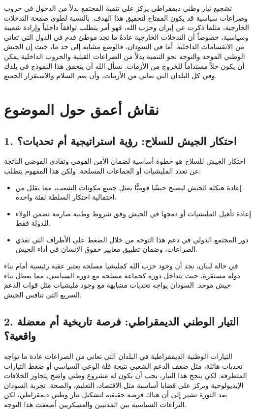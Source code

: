 \documentclass[12pt]{article}
\begin{document}
تشجيع تيار وطني ديمقراطي يركز على تنمية المجتمع بدلاً من الدخول في حروب وصراعات سياسية قد يكون المفتاح لتحقيق هذا الهدف. بالنسبة لطوي صفحة التدخلات الخارجية، مثلما ذكرت عن إيران وحزب الله، فهو أمر يتطلب توافقاً داخلياً وإرادة شعبية وسياسية، خصوصاً أن التدخلات الخارجية عادةً ما تجد موطئ قدم في الدول التي تعاني من الانقسامات الداخلية. أما في السودان، فالوضع مشابه إلى حد ما، حيث إن الجيش الوطني الموحد والتوجه نحو التنمية بدلاً من الصراعات القبلية والحروب الداخلية يمكن أن يكون حلاً مستداماً للخروج من الأزمات. نسأل الله أن يتحقق هذا النموذج في بلدك وفي كل البلدان التي تعاني من الأزمات، وأن يعم السلام والاستقرار الجميع.

\section*{نقاش أعمق حول الموضوع}

\subsection*{1. احتكار الجيش للسلاح: رؤية استراتيجية أم تحديات؟}
احتكار الجيش للسلاح هو خطوة أساسية لضمان الأمن القومي وتفادي الفوضى الناتجة عن تعدد المليشيات أو الجماعات المسلحة. ولكن هذا المفهوم يتطلب:
\begin{itemize}
    \item إعادة هيكلة الجيش ليصبح جيشًا قوميًّا يمثل جميع مكونات الشعب، مما يقلل من احتمالية احتكار السلطة لفئة واحدة.
    \item إعادة تأهيل المليشيات أو دمجها في الجيش وفق شروط وطنية صارمة تضمن الولاء للدولة فقط.
    \item دور المجتمع الدولي في دعم هذا التوجه من خلال الضغط على الأطراف التي تغذي الصراعات، وضمان تطبيق معايير حقوق الإنسان في أداء الجيش.
\end{itemize}

في حالة لبنان، نجد أن وجود حزب الله كمليشيا مسلحة يعتبر عقبة رئيسية أمام بناء دولة مستقرة، حيث يتداخل دوره كجماعة مسلحة مع دوره السياسي، مما يعطل بناء جيش موحد. السودان يواجه تحديات مشابهة مع وجود مليشيات مثل قوات الدعم السريع التي تنافس الجيش.

\subsection*{2. التيار الوطني الديمقراطي: فرصة تاريخية أم معضلة واقعية؟}
التيارات الوطنية الديمقراطية في البلدان التي تعاني من الصراعات عادة ما تواجه تحديات هائلة، مثل ضعف الدعم الشعبي نتيجة قلة الوعي السياسي أو ضغط التيارات المتطرفة. لكي ينجح هذا التيار، يجب أن يكون له مشروع وطني واضح يتجاوز الخلافات الإيديولوجية ويركز على قضايا أساسية مثل الاقتصاد، التعليم، والصحة. تجربة السودان بعد الثورة تشير إلى أن هناك فرصة حقيقية لتشكيل تيار وطني ديمقراطي، لكن النزاعات السياسية بين المدنيين والعسكريين أضعفت هذا التوجه.
\end{document}
